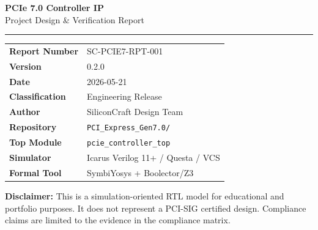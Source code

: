 \documentclass[12pt,a4paper]{report}
\begin{document}

\begin{titlepage}

\vspace*{25mm}
{\color{white}\fontsize{32}{40}\selectfont\bfseries PCIe 7.0 Controller IP}\\[5mm]
{\color{white!85!scblue}\fontsize{20}{28}\selectfont Project Design \& Verification Report}

\vspace{15mm}
\textcolor{scblue!30}{\rule{\linewidth}{0.4pt}}

\vspace{8mm}
\begin{tabular}{@{}ll}
  \textbf{Report Number} & SC-PCIE7-RPT-001 \\[3mm]
  \textbf{Version}       & 0.2.0 \\[3mm]
  \textbf{Date}          & 2026-05-21 \\[3mm]
  \textbf{Classification}& Engineering Release \\[3mm]
  \textbf{Author}        & SiliconCraft Design Team \\[3mm]
  \textbf{Repository}    & \texttt{PCI\_Express\_Gen7.0/} \\[3mm]
  \textbf{Top Module}    & \texttt{pcie\_controller\_top} \\[3mm]
  \textbf{Simulator}     & Icarus Verilog 11+ / Questa / VCS \\[3mm]
  \textbf{Formal Tool}   & SymbiYosys + Boolector/Z3 \\
\end{tabular}

\vfill
\begin{notebox}
  \textbf{Disclaimer:} This is a simulation-oriented RTL model for educational and
  portfolio purposes. It does not represent a PCI-SIG certified design.
  Compliance claims are limited to the evidence in the compliance matrix.
\end{notebox}
\end{titlepage}
\end{document}
